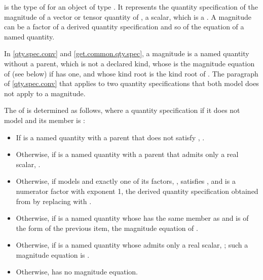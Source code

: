 \pnum
{} is the type of 
for an object  of type .
It represents the quantity specification of the magnitude of a vector or tensor quantity of ,
a scalar, which is a .
A magnitude can be a factor of a derived quantity specification
and so of the equation of a named quantity.

\pnum
In \ref{qty.spec.conv} and \ref{get.common.qty.spec},
a magnitude  is a named quantity without a parent, which is not a declared kind,
whose  is the magnitude equation of  (see below) if  has one,
and whose kind root is the kind root of .
The paragraph of \ref{qty.spec.conv} that applies 
to two quantity specifications that both model 
does not apply to a magnitude.

\pnum
The  of  is determined as follows,
where a quantity specification  if
it does not model  and its member  is :
\begin{itemize}
\item
If  is a named quantity with a parent  that does not satisfy ,
.
\item
Otherwise, if  is a named quantity with a parent  that admits only a real scalar,
.
\item
Otherwise, if  models  and
exactly one of its factors, , satisfies ,
and  is a numerator factor with exponent 1,
the derived quantity specification obtained from  by replacing  with .
\item
Otherwise, if  is a named quantity whose  
has the same member  as  and is of the form of the previous item,
the magnitude equation of .
\item
Otherwise, if  is a named quantity whose   admits only a real scalar,
; such a magnitude equation is .
\item
Otherwise,  has no magnitude equation.
\end{itemize}

